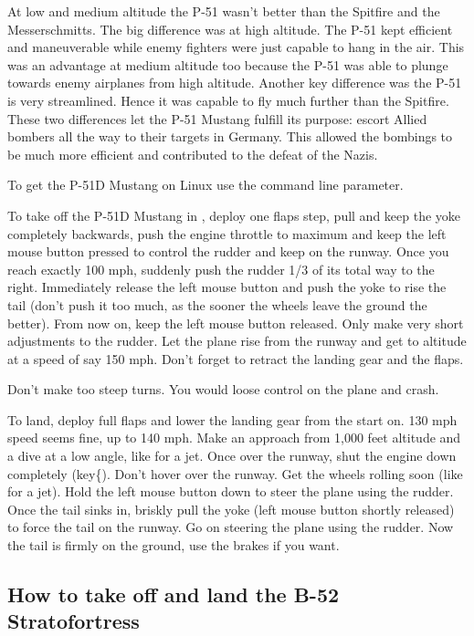 \begin{itemize}
    At low and medium altitude the P-51 wasn't better than the Spitfire
    and the Messerschmitts. The big difference was at high altitude.
    The P-51 kept efficient and maneuverable while enemy fighters were
    just capable to hang in the air. This was an advantage at medium
    altitude too because the P-51 was able to plunge towards enemy
    airplanes from high altitude. Another key difference was the P-51
    is very streamlined. Hence it was capable to fly much further than
    the Spitfire. These two differences let the P-51 Mustang fulfill
    its purpose: escort Allied bombers all the way to their targets in
    Germany. This allowed the bombings to be much more efficient and
    contributed to the defeat of the Nazis.

    To get the P-51D Mustang on Linux use the
     command line parameter.

    To take off the P-51D Mustang in \FlightGear, deploy one flaps step, pull
    and keep the yoke completely backwards, push the engine throttle to
    maximum and keep the left mouse button pressed to control the
    rudder and keep on the runway. Once you reach exactly 100 mph,
    suddenly push the rudder 1/3 of its total way to the right.
    Immediately release the left mouse button and push the yoke to rise
    the tail (don't push it too much, as the sooner the wheels leave
    the ground the better). From now on, keep the left mouse button
    released. Only make very short adjustments to the rudder. Let the
    plane rise from the runway and get to altitude at a speed of say
    150 mph. Don't forget to retract the landing gear and the flaps.

Don't make too steep turns. You would loose control on the plane and crash.

To land, deploy full flaps and lower the landing gear from the start
on. 130 mph speed seems fine, up to 140 mph. Make an approach from
1,000 feet altitude and a dive at a low angle, like for a jet. Once
over the runway, shut the engine down completely (key{\{}). Don't hover
over the runway. Get the wheels rolling soon (like for a jet). Hold the
left mouse button down to steer the plane using the rudder. Once the
tail sinks in, briskly pull the yoke (left mouse button shortly
released) to force the tail on the runway. Go on steering the plane
using the rudder. Now the tail is firmly on the ground, use the brakes
if you want.

    \subsection{How to take off and land the B-52 Stratofortress}
    \label{sec:B52}


\end{itemize}
